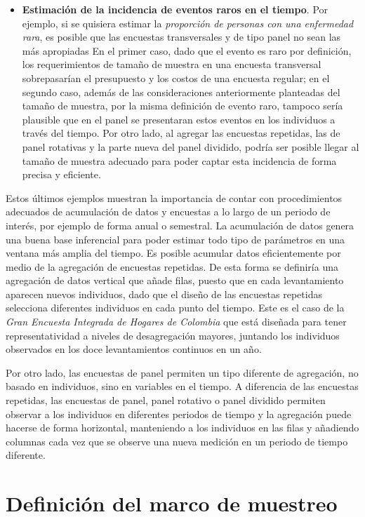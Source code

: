 \documentclass[
  12pt,
  spanish,
]{book}
\begin{document}
\begin{itemize}
\item
  \textbf{Estimación de la incidencia de eventos raros en el tiempo}. Por ejemplo, si se quisiera estimar la \emph{proporción de personas con una enfermedad rara}, es posible que las encuestas transversales y de tipo panel no sean las más apropiadas En el primer caso, dado que el evento es raro por definición, los requerimientos de tamaño de muestra en una encuesta transversal sobrepasarían el presupuesto y los costos de una encuesta regular; en el segundo caso, además de las consideraciones anteriormente planteadas del tamaño de muestra, por la misma definición de evento raro, tampoco sería plausible que en el panel se presentaran estos eventos en los individuos a través del tiempo. Por otro lado, al agregar las encuestas repetidas, las de panel rotativas y la parte nueva del panel dividido, podría ser posible llegar al tamaño de muestra adecuado para poder captar esta incidencia de forma precisa y eficiente.
\end{itemize}

Estos últimos ejemplos muestran la importancia de contar con procedimientos adecuados de acumulación de datos y encuestas a lo largo de un periodo de interés, por ejemplo de forma anual o semestral. La acumulación de datos genera una buena base inferencial para poder estimar todo tipo de parámetros en una ventana más amplia del tiempo. Es posible acumular datos eficientemente por medio de la agregación de encuestas repetidas. De esta forma se definiría una agregación de datos vertical que añade filas, puesto que en cada levantamiento aparecen nuevos individuos, dado que el diseño de las encuestas repetidas selecciona diferentes individuos en cada punto del tiempo. Este es el caso de la \emph{Gran Encuesta Integrada de Hogares de Colombia} que está diseñada para tener representatividad a niveles de desagregación mayores, juntando los individuos observados en los doce levantamientos continuos en un año.

Por otro lado, las encuestas de panel permiten un tipo diferente de agregación, no basado en individuos, sino en variables en el tiempo. A diferencia de las encuestas repetidas, las encuestas de panel, panel rotativo o panel dividido permiten observar a los individuos en diferentes periodos de tiempo y la agregación puede hacerse de forma horizontal, manteniendo a los individuos en las filas y añadiendo columnas cada vez que se observe una nueva medición en un periodo de tiempo diferente.

\hypertarget{definiciuxf3n-del-marco-de-muestreo}{%
\chapter{Definición del marco de muestreo}\label{definiciuxf3n-del-marco-de-muestreo}}
\end{document}
